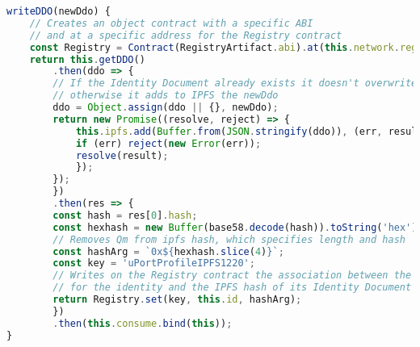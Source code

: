 \begin{lstlisting}[language=JavaScript, numbers=none]
writeDDO(newDdo) {
    // Creates an object contract with a specific ABI 
    // and at a specific address for the Registry contract
    const Registry = Contract(RegistryArtifact.abi).at(this.network.registry);
    return this.getDDO()
        .then(ddo => {
        // If the Identity Document already exists it doesn't overwrite with the given one,
        // otherwise it adds to IPFS the newDdo
        ddo = Object.assign(ddo || {}, newDdo);
        return new Promise((resolve, reject) => {
            this.ipfs.add(Buffer.from(JSON.stringify(ddo)), (err, result) => {
            if (err) reject(new Error(err));
            resolve(result);
            });
        });
        })
        .then(res => {
        const hash = res[0].hash;
        const hexhash = new Buffer(base58.decode(hash)).toString('hex');
        // Removes Qm from ipfs hash, which specifies length and hash
        const hashArg = `0x${hexhash.slice(4)}`;
        const key = 'uPortProfileIPFS1220';
        // Writes on the Registry contract the association between the Proxy contract address
        // for the identity and the IPFS hash of its Identity Document which contains its pubkey
        return Registry.set(key, this.id, hashArg);
        })
        .then(this.consume.bind(this));
}
\end{lstlisting}
